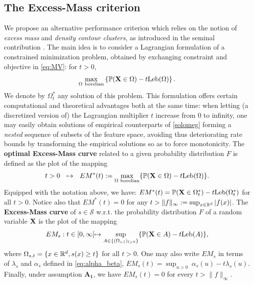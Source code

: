 \subsection{The Excess-Mass criterion}
\label{resume:em-curve}
We propose an alternative performance criterion which relies on the notion of \textit{excess mass} and \textit{density contour clusters}, as introduced in the seminal contribution \cite{Polonik95}. The main idea is to consider a Lagrangian formulation of a constrained minimization problem, obtained by exchanging constraint and objective in \eqref{eq:MV}: for $t>0$,
\begin{equation}
\label{solomeg}
\max_{\Omega~ \text{borelian}}  \left\{ \mathbb{P}(\mathbf X \in \Omega) - t \text{Leb}(\Omega) \right\}.
\end{equation}
We denote by $\Omega^*_t$ any solution of this problem. This formulation offers certain computational and theoretical advantages both at the same time: when letting (a discretized version of) the Lagrangian multiplier $t$ increase from $0$ to infinity, one may easily obtain solutions of empirical counterparts of \eqref{solomeg} forming a \textit{nested} sequence of subsets of the feature space, avoiding thus deteriorating rate bounds by transforming the empirical solutions so as to force monotonicity.
%
The \textbf{optimal Excess-Mass curve} related to a given probability distribution $F$ is defined as the plot of the mapping $$t>0~~\mapsto~~ EM^*(t):=\max_{\Omega\text{ borelian} } \{ {\mathbb{P}} (\mathbf X\in \Omega)-t\text{Leb}(\Omega) \}.$$ 
Equipped with the notation above, we have: $EM^*(t)=\mathbb{P}(\mathbf X \in \Omega_t^*)-t \text{Leb}(\Omega_t^*)$ for all $t>0$.
Notice also that $EM^*(t) = 0$ for any $t>\|f\|_\infty:=\sup_{x\in \mathbb{R}^d}\vert f(x)\vert$. 
%
The  \textbf{Excess-Mass curve} of $s\in\mathcal{S}$  w.r.t. the probability distribution $F$ of a random variable $\mathbf X$ is the plot of the mapping
\begin{equation}
\label{EM}
EM_s : t \in [0, \infty[ \mapsto \sup_{A \in \{(\Omega_{s,l})_{l>0}\}}\{ {\mathbb{P}}(\mathbf X \in A) - t \text{Leb}(A)\},
\end{equation}
where $\Omega_{s,t}=\{ x \in \mathbb{R}^d, s(x) \ge t \}$ for all $t>0$.
One may also write $EM_s$ in terms of $\lambda_s$ and $\alpha_s$ defined in \eqref{eq:alpha_beta}, $EM_s(t)= \sup_{u>0}~ \alpha_s(u) -t \lambda_s(u) $. Finally, under assumption $\mathbf{A_1}$, we have $EM_s(t)=0$ for every $t> \|f\|_\infty$. 
